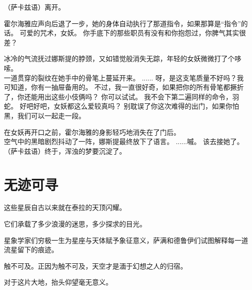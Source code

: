 \documentclass[openany]{book}
\begin{document}
\begin{dialogue}
     （萨卡兹语）离开。\par
    霍尔海雅应声向后退了一步，她的身体自动执行了那道指令，如果那算是“指令”的话。
     可爱的咒术，女妖。
     你手底下的那些职员有没有和你抱怨过，你脾气其实很差？\par
    冰冷的气流抚过娜斯提的脖颈，又如错觉般消失无踪，年轻的女妖微微打了个哆嗦。\\
    一道贯穿的裂纹在她手中的骨笔上蔓延开来。
     ......
     呀，是这支笔质量不好吗？我可知道，你有一抽屉备用的。
     不过，我一直很好奇，如果把你的所有骨笔都撅折了，你还能用出这些小伎俩吗？
     你可以试试。
     我不会下第二遍同样的命令，羽蛇。
     好吧好吧，女妖都这么爱较真吗？
     别耽误了你这次难得的出门，如果你怕黑，我们可以一起走一段。\par
    在女妖再开口之前，霍尔海雅的身影轻巧地消失在了门后。\\
    空气中的黑暗剧烈抖动了一阵，娜斯提最终放下了语言。
     ......嘁。
     该去接她了。
     （萨卡兹语）终于，浑浊的梦要沉淀了。
\end{dialogue}

\chapter{无迹可寻}
这些星辰自古以来就在泰拉的天顶闪耀。\par
它们承载了多少浪漫的迷思，多少探求的目光。\par
星象学家们穷极一生为星座与天体赋予象征意义，萨满和德鲁伊们试图解释每一道流星留下的痕迹。\par
触不可及。正因为触不可及，天空才是湎于幻想之人的归宿。\par
对于这片大地，抬头仰望毫无意义。
\end{document}
